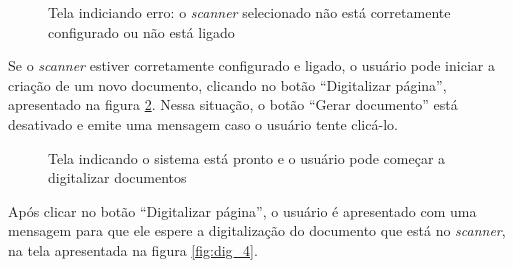 \begin{figure}[h]
 \centering
    \setlength\fboxsep{0pt}
    \setlength\fboxrule{0.5pt}
  \caption {Tela indiciando erro: o {\it scanner} selecionado não está corretamente configurado ou não está ligado}
  \label{fig:dig_2}
\end{figure}

Se o {\it scanner} estiver corretamente configurado e ligado, o usuário pode iniciar a criação de um novo documento, clicando no botão ``Digitalizar página'', apresentado na figura \ref{fig:dig_3}. Nessa situação, o botão ``Gerar documento'' está desativado e emite uma mensagem caso o usuário tente clicá-lo.

\begin{figure}[h]
 \centering
    \setlength\fboxsep{0pt}
    \setlength\fboxrule{0.5pt}
  \caption {Tela indicando o sistema está pronto e o usuário pode começar a digitalizar documentos}
  \label{fig:dig_3}
\end{figure}

Após clicar no botão ``Digitalizar página'', o usuário é apresentado com uma mensagem para que ele espere a digitalização do documento que está no {\it scanner}, na tela apresentada na figura \ref{fig:dig_4}.

